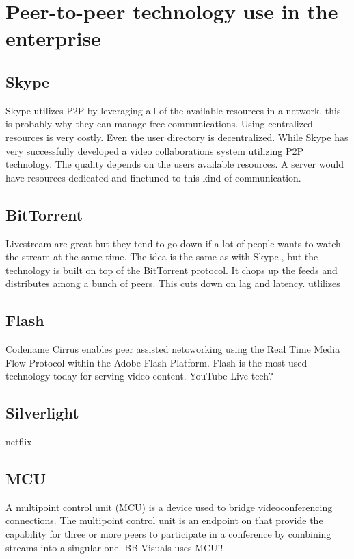 \section{Peer-to-peer technology use in the enterprise}

\subsection{Skype}
Skype utilizes P2P by leveraging all of the available resources in a network, this is probably why they can manage free communications. Using centralized resources is very costly.
Even the user directory is decentralized. While Skype has very successfully developed a video collaborations system utilizing P2P technology. The quality depends on the users available resources. A server would have resources dedicated and finetuned to this kind of communication.

\subsection{BitTorrent}
Livestream are great but they tend to go down if a lot of people wants to watch the stream at the same time. The idea is the same as with Skype., but the technology is built on top of the BitTorrent protocol. It chops up the feeds and distributes among a bunch of peers. This cuts down on lag and latency.
 utlilizes	

\subsection{Flash}
Codename Cirrus enables peer assisted netoworking using the Real Time Media Flow Protocol within the Adobe Flash Platform. Flash is the most used technology today for serving video content. YouTube Live tech?

\subsection{Silverlight}
netflix

\subsection{MCU}
A multipoint control unit (MCU) is a device used to bridge videoconferencing connections. The multipoint control unit is an endpoint on that provide the capability for three or more peers to participate in  a conference by combining streams into a singular one.
BB Visuals uses MCU!!

